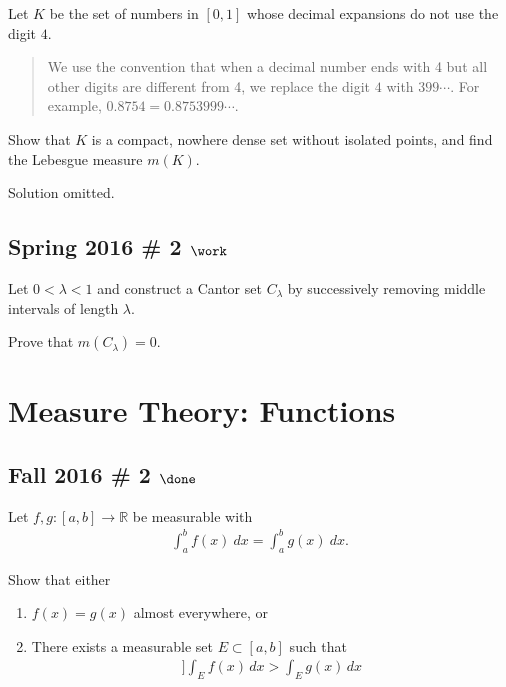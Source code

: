 Let \(K\) be the set of numbers in \([0, 1]\) whose decimal expansions
do not use the digit \(4\).

\begin{quote}
We use the convention that when a decimal number ends with 4 but all
other digits are different from 4, we replace the digit \(4\) with
\(399\cdots\). For example, \(0.8754 = 0.8753999\cdots\).
\end{quote}

Show that \(K\) is a compact, nowhere dense set without isolated points,
and find the Lebesgue measure \(m(K)\).

Solution omitted.

\hypertarget{spring-2016-2-work}{%
\subsection{\texorpdfstring{Spring 2016 \# 2
\(\work\)}{Spring 2016 \# 2 \textbackslash work}}\label{spring-2016-2-work}}

Let \(0 < \lambda < 1\) and construct a Cantor set \(C_\lambda\) by
successively removing middle intervals of length \(\lambda\).

Prove that \(m(C_\lambda) = 0\).

\hypertarget{measure-theory-functions}{%
\section{Measure Theory: Functions}\label{measure-theory-functions}}

\hypertarget{fall-2016-2-done}{%
\subsection{\texorpdfstring{Fall 2016 \# 2
\(\done\)}{Fall 2016 \# 2 \textbackslash done}}\label{fall-2016-2-done}}

Let \(f, g: [a, b] \to {\mathbb{R}}\) be measurable with
\begin{align*}
\int_{a}^{b} f(x) ~d x=\int_{a}^{b} g(x) ~d x.
\end{align*}

Show that either

\begin{enumerate}
\def\labelenumi{\arabic{enumi}.}
\tightlist
\item
  \(f(x) = g(x)\) almost everywhere, or
\item
  There exists a measurable set \(E \subset [a, b]\) such that
  \begin{align*}]
  \int _{E} f(x) \, dx > \int _{E} g(x) \, dx
  \end{align*}
\end{enumerate}


